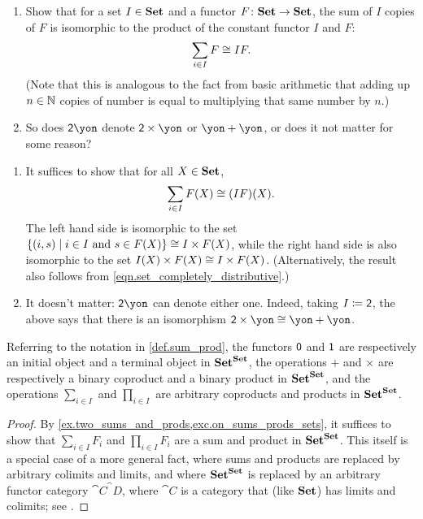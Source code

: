 \documentclass[Book-Poly]{subfiles}
\begin{document}
\begin{exercise} \label{exc.repeated_sum_is_product}
\begin{enumerate}
	\item Show that for a set $I \in \mathbf{Set}$ and a functor $F \colon \mathbf{Set} \to \mathbf{Set}$, the sum of $I$ copies of $F$ is isomorphic to the product of the constant functor $I$ and $F$:
    \[
        \sum_{i \in I} F \cong IF.
    \]
    (Note that this is analogous to the fact from basic arithmetic that adding up $n \in \mathbb{N}$ copies of number is equal to multiplying that same number by $n$.)
	\item So does $\2\yon$ denote $\2\times\yon$ or $\yon+\yon$, or does it not matter for some reason?
\qedhere
	\end{enumerate}
\begin{solution}
\begin{enumerate}
	\item It suffices to show that for all $X \in \mathbf{Set}$,
    \[
      \sum_{i \in I} F(X) \cong (IF)(X).
    \]
    The left hand side is isomorphic to the set $\{(i,s)\mid i\in I\text{ and }s\in F(X)\} \cong I \times F(X)$, while the right hand side is also isomorphic to the set $I(X) \times F(X) \cong I \times F(X)$. (Alternatively, the result also follows from \eqref{eqn.set_completely_distributive}.)
    \item It doesn't matter: $\2\yon$ can denote either one. Indeed, taking $I\coloneqq\textsf{2}$, the above says that there is an isomorphism $\2\times\yon\cong\yon+\yon$. 
\end{enumerate}
\end{solution}
\end{exercise}

\begin{proposition} \label{prop.prods_coprods_set_endofuncs}
Referring to the notation in \cref{def.sum_prod}, the functors $\textsf{0}$ and $\textsf{1}$ are respectively an initial object and a terminal object in $\mathbf{Set}^{\mathbf{Set}}$, the operations $+$ and $\times$ are respectively a binary coproduct and a binary product in $\mathbf{Set}^{\mathbf{Set}}$, and the operations $\sum_{i\in I}$ and $\prod_{i\in I}$ are arbitrary coproducts and products in $\mathbf{Set}^{\mathbf{Set}}$.
\end{proposition}
\begin{proof}
By \cref{ex.two_sums_and_prods,exc.on_sums_prods_sets}, it suffices to show that $\sum_{i\in I}F_i$ and $\prod_{i\in I}F_i$ are a sum and product in $\mathbf{Set}^{\mathbf{Set}}$. This itself is a special case of a more general fact, where sums and products are replaced by arbitrary colimits and limits, and where $\mathbf{Set}^{\mathbf{Set}}$ is replaced by an arbitrary functor category $\cat{C}^\cat{D}$, where $\cat{C}$ is a category that (like $\mathbf{Set}$) has limits and colimits; see \cite[page 22 -- 23, displays (24) and (25)]{macLane1992sheaves}.
\end{proof}
\end{document}
